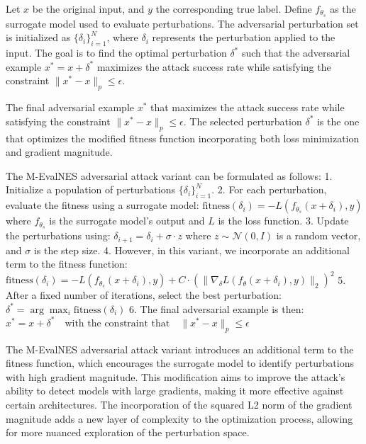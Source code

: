 Let \( x \) be the original input, and \( y \) the corresponding true label. Define \( f_{\theta_s} \) as the surrogate model used to evaluate perturbations. The adversarial perturbation set is initialized as \( \{\delta_i\}_{i=1}^N \), where \( \delta_i \) represents the perturbation applied to the input. The goal is to find the optimal perturbation \( \delta^* \) such that the adversarial example \( x^* = x + \delta^* \) maximizes the attack success rate while satisfying the constraint \( \|x^* - x\|_p \leq \epsilon \).

The final adversarial example \( x^* \) that maximizes the attack success rate while satisfying the constraint \( \|x^* - x\|_p \leq \epsilon \). The selected perturbation \( \delta^* \) is the one that optimizes the modified fitness function incorporating both loss minimization and gradient magnitude.


The M-EvalNES adversarial attack variant can be formulated as follows:
1. Initialize a population of perturbations $\{\delta_i\}_{i=1}^N$.
2. For each perturbation, evaluate the fitness using a surrogate model:
   $\text{fitness}(\delta_i) = -L(f_{\theta_s}(x + \delta_i), y)$
   where $f_{\theta_s}$ is the surrogate model's output and $L$ is the loss function.
3. Update the perturbations using:
   $\delta_{i+1} = \delta_i + \sigma \cdot z$
   where $z \sim \mathcal{N}(0, I)$ is a random vector, and $\sigma$ is the step size.
4. However, in this variant, we incorporate an additional term to the fitness function:
   $\text{fitness}(\delta_i) = -L(f_{\theta_s}(x + \delta_i), y) + C \cdot (\|\nabla_\delta L(f_\theta(x + \delta_i), y)\|_2)^2$
5. After a fixed number of iterations, select the best perturbation:
   $\delta^* = \arg\max_{i} \text{fitness}(\delta_i)$
6. The final adversarial example is then:
   $x^* = x + \delta^* \quad \text{with the constraint that} \quad \|x^* - x\|_p \leq \epsilon$

The M-EvalNES adversarial attack variant introduces an additional term to the fitness function, which encourages the surrogate model to identify perturbations with high gradient magnitude. This modification aims to improve the attack's ability to detect models with large gradients, making it more effective against certain architectures. The incorporation of the squared L2 norm of the gradient magnitude adds a new layer of complexity to the optimization process, allowing for more nuanced exploration of the perturbation space.
